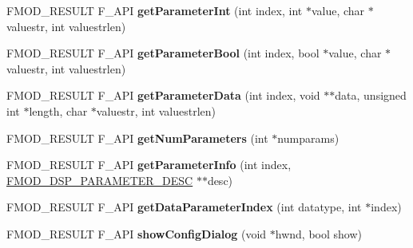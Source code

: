 \begin{DoxyCompactItemize}
\item 
\hypertarget{class_f_m_o_d_1_1_d_s_p_a3ec0a889d95b1ebc5bff08d78fc13587}{F\+M\+O\+D\+\_\+\+R\+E\+S\+U\+L\+T F\+\_\+\+A\+P\+I {\bfseries get\+Parameter\+Int} (int index, int $\ast$value, char $\ast$valuestr, int valuestrlen)}\label{class_f_m_o_d_1_1_d_s_p_a3ec0a889d95b1ebc5bff08d78fc13587}

\item 
\hypertarget{class_f_m_o_d_1_1_d_s_p_addad4ecd4b44b59492d93be8e78e23dd}{F\+M\+O\+D\+\_\+\+R\+E\+S\+U\+L\+T F\+\_\+\+A\+P\+I {\bfseries get\+Parameter\+Bool} (int index, bool $\ast$value, char $\ast$valuestr, int valuestrlen)}\label{class_f_m_o_d_1_1_d_s_p_addad4ecd4b44b59492d93be8e78e23dd}

\item 
\hypertarget{class_f_m_o_d_1_1_d_s_p_aea796a0521ef8fd6027f8683bcf4c879}{F\+M\+O\+D\+\_\+\+R\+E\+S\+U\+L\+T F\+\_\+\+A\+P\+I {\bfseries get\+Parameter\+Data} (int index, void $\ast$$\ast$data, unsigned int $\ast$length, char $\ast$valuestr, int valuestrlen)}\label{class_f_m_o_d_1_1_d_s_p_aea796a0521ef8fd6027f8683bcf4c879}

\item 
\hypertarget{class_f_m_o_d_1_1_d_s_p_aba45842920caedf11c614d77aa028ab3}{F\+M\+O\+D\+\_\+\+R\+E\+S\+U\+L\+T F\+\_\+\+A\+P\+I {\bfseries get\+Num\+Parameters} (int $\ast$numparams)}\label{class_f_m_o_d_1_1_d_s_p_aba45842920caedf11c614d77aa028ab3}

\item 
\hypertarget{class_f_m_o_d_1_1_d_s_p_a09d63f638fc2af4dfeed6e2ff03246a5}{F\+M\+O\+D\+\_\+\+R\+E\+S\+U\+L\+T F\+\_\+\+A\+P\+I {\bfseries get\+Parameter\+Info} (int index, \hyperlink{struct_f_m_o_d___d_s_p___p_a_r_a_m_e_t_e_r___d_e_s_c}{F\+M\+O\+D\+\_\+\+D\+S\+P\+\_\+\+P\+A\+R\+A\+M\+E\+T\+E\+R\+\_\+\+D\+E\+S\+C} $\ast$$\ast$desc)}\label{class_f_m_o_d_1_1_d_s_p_a09d63f638fc2af4dfeed6e2ff03246a5}

\item 
\hypertarget{class_f_m_o_d_1_1_d_s_p_a68024a75eddd65053f75a803360ad116}{F\+M\+O\+D\+\_\+\+R\+E\+S\+U\+L\+T F\+\_\+\+A\+P\+I {\bfseries get\+Data\+Parameter\+Index} (int datatype, int $\ast$index)}\label{class_f_m_o_d_1_1_d_s_p_a68024a75eddd65053f75a803360ad116}

\item 
\hypertarget{class_f_m_o_d_1_1_d_s_p_a9a77cb36dbbc0bb053b42eb4d2dcd1f7}{F\+M\+O\+D\+\_\+\+R\+E\+S\+U\+L\+T F\+\_\+\+A\+P\+I {\bfseries show\+Config\+Dialog} (void $\ast$hwnd, bool show)}\label{class_f_m_o_d_1_1_d_s_p_a9a77cb36dbbc0bb053b42eb4d2dcd1f7}


\end{DoxyCompactItemize}
